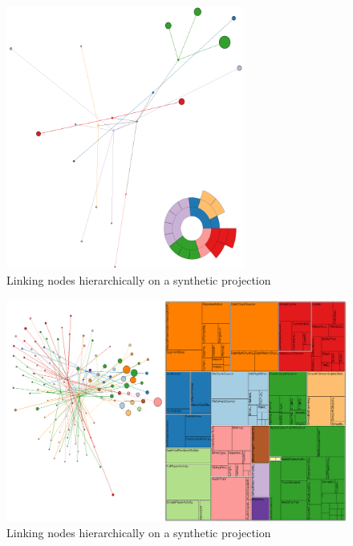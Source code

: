 \begin{figure}[H]
	\centering
	\includegraphics[width=0.7\textwidth]{figures/hier_graph_synth.png}
	\caption{Linking nodes hierarchically on a synthetic projection}
	\label{fig:hier_graph_synth}
\end{figure}


\begin{figure}[H]
	\centering
	\includegraphics[width=1.0\textwidth]{figures/hier_sim_graph.png}
	\caption{Linking nodes hierarchically on a synthetic projection}
	\label{fig:hier_sim_graph}
\end{figure}

